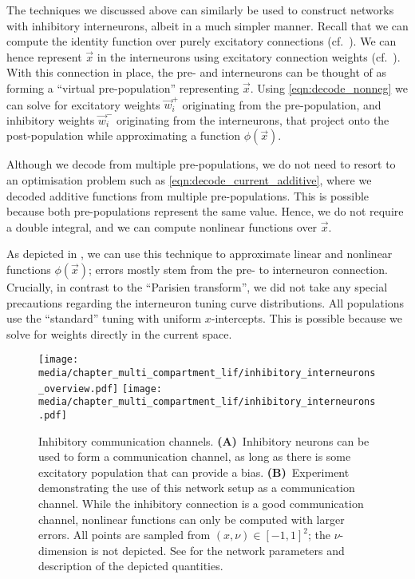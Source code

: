 The techniques we discussed above can similarly be used to construct networks with inhibitory interneurons, albeit in a much simpler manner.
Recall that we can compute the identity function over purely excitatory connections (cf.~).
We can hence represent $\vec x$ in the interneurons using excitatory connection weights (cf.~).
With this connection in place, the pre- and interneurons can be thought of as forming a \enquote{virtual pre-population} representing $\vec x$.
Using \cref{eqn:decode_nonneg} we can solve for excitatory weights $\vec w_i^+$ originating from the pre-population, and inhibitory weights $\vec w_i^-$ originating from the interneurons, that project onto the post-population while approximating a function $\phi(\vec x)$.

Although we decode from multiple pre-populations, we do not need to resort to an optimisation problem such as \cref{eqn:decode_current_additive}, where we decoded additive functions from multiple pre-populations.
This is possible because both pre-populations represent the same value.
Hence, we do not require a double integral, and we can compute nonlinear functions over $\vec x$.

As depicted in , we can use this technique to approximate linear and nonlinear functions $\phi(\vec x)$; errors mostly stem from the pre- to interneuron connection.
Crucially, in contrast to the \enquote{Parisien transform}, we did not take any special precautions regarding the interneuron tuning curve distributions.
All populations use the \enquote{standard} tuning with uniform $x$-intercepts.
This is possible because we solve for weights directly in the current space.

\begin{figure}
	\texttt{[image: media/chapter\_multi\_compartment\_lif/inhibitory\_interneurons\_overview.pdf]}%
	\texttt{[image: media/chapter\_multi\_compartment\_lif/inhibitory\_interneurons.pdf]}%
	{\label{fig:inhibitory_comm_a}}%
	{\label{fig:inhibitory_comm_b}}%
	\caption[Inhibitory communication channels]{Inhibitory communication channels.
	\textbf{(A)}~Inhibitory neurons can be used to form a communication channel, as long as there is some excitatory population that can provide a bias.
	\textbf{(B)}~Experiment demonstrating the use of this network setup as a communication channel.
	While the inhibitory connection is a good communication channel, nonlinear functions can only be computed with larger errors.
	All points are sampled from $(x, \nu) \in [-1, 1]^2$; the $\nu$-dimension is not depicted.
	See  for the network parameters and description of the depicted quantities.
	}
	\label{fig:inhibitory_comm}
\end{figure}

